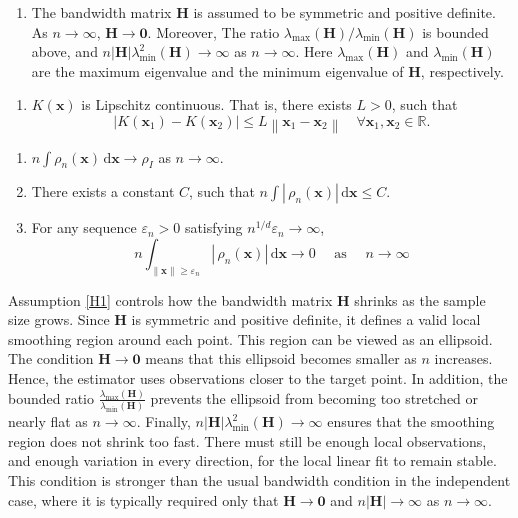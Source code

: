 \documentclass[12pt]{report} %
\newcommand{\bH}{\mathbf{H}}
\newcommand{\bx}{\mathbf{x}}
\newcommand{\rd}{\mathrm{d}}
\begin{document}
\begin{enumerate}[label=\textbf{(H\arabic*)}, ref=\textbf{(H\arabic*)}]
    \item \label{H1} The bandwidth matrix $\bH$ is assumed to be symmetric and positive definite. As $n \to \infty$, $\bH \to \mathbf{0}$. Moreover, The ratio $\lambda_{\max }(\bH) / \lambda_{\min }(\bH)$ is bounded above, and
     $n|\bH| \lambda_{\min }^2(\bH) \rightarrow \infty$ as $n \rightarrow \infty$. Here $\lambda_{\max }(\bH)$ and $\lambda_{\min }(\bH)$ are the maximum eigenvalue and the minimum eigenvalue of $\bH$, respectively. 
     \vspace{-0.25cm}
\end{enumerate} 
\begin{enumerate}[label=\textbf{(K\arabic*)}, ref=\textbf{(K\arabic*)}]
     \item \label{K1} $K(\bx)$ is Lipschitz continuous. That is, there exists $L>0$, such that
     $$
     \left|K\left(\bx_1\right)-K\left(\bx_2\right)\right| \leq L\left\|\bx_1-\bx_2\right\| \quad \forall \bx_1, \bx_2 \in \mathbb{R}.
     $$
     \vspace{-0.25cm}
\end{enumerate}
\begin{enumerate}[label=\textbf{(B\arabic*)}, ref=\textbf{(B\arabic*)}, start = 3]
    
    \item \label{B3} $n \int \rho_n(\bx) \, \rd \bx \rightarrow \rho_I$ as $n \rightarrow \infty$. 
    
    \item \label{B4} There exists a constant $C$, such that $n \int\left| \,\rho_n(\bx)\right| \, \rd \bx \leq C$.

    \item \label{B5} For any sequence $\varepsilon_n>0$ satisfying $n^{1 / d} \varepsilon_n \rightarrow \infty$,
    $$
    n \int_{\|\bx\| \geq \varepsilon_n}\left|\,\rho_n(\bx)\right | \, \rd \bx \rightarrow 0 \quad \text { as } \quad n \rightarrow \infty$$ 
\end{enumerate}

Assumption \ref{H1} controls how the bandwidth matrix $\bH$ shrinks as the sample size grows. Since $\bH$ is symmetric and positive definite, it defines a valid local smoothing region around each point. This region can be viewed as an ellipsoid. The condition $\bH \to \mathbf{0}$ means that this ellipsoid becomes smaller as $n$ increases. Hence, the estimator uses observations closer to the target point. In addition, the bounded ratio $\frac{\lambda_{\max}(\bH)}{\lambda_{\min}(\bH)}$ prevents the ellipsoid from becoming too stretched or nearly flat as $n \to \infty$. Finally, $n|\bH|\lambda_{\min}^2(\bH)\to\infty$
ensures that the smoothing region does not shrink too fast. There must still be enough local observations, and enough variation in every direction, for the local linear fit to remain stable. This condition is stronger than the usual bandwidth condition in the independent case, where it is typically required only that $\bH\to\mathbf{0}$ and $n|\bH|\to\infty$ as $n\to\infty$.
\end{document}

